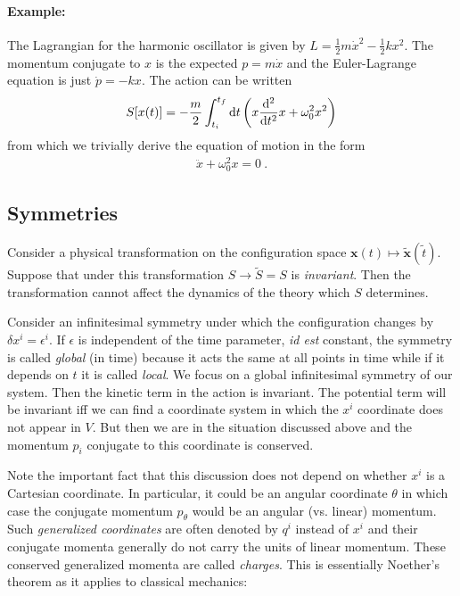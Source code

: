 \documentclass[12pt]{article}
\begin{document}
\paragraph{Example:} The Lagrangian for the harmonic oscillator is given by $L=\frac 12 m \dot x^2-\frac 12 k x^2$. 
The momentum conjugate to $x$ is the expected $p=m\dot x$ and the Euler-Lagrange equation is just $\dot p=-kx$. 
The action can be written
\begin{eqnarray}
S[x(t)]=-{m\over 2} \int_{t_i}^{t_f} \mathrm d t  \left(x{\mathrm d^2\over \mathrm d t^2}x+\omega_0^2 x^2\right) 
\end{eqnarray}
from which we trivially derive the equation of motion in the form
\begin{eqnarray}
\ddot x+\omega_0^2x=0~. 
\end{eqnarray}


\subsection{Symmetries}

Consider a physical transformation on the configuration space $\mathbf x(t)\mapsto \tilde{\mathbf x}(\tilde t)$. Suppose that under this transformation $S\to \tilde S=S$ is {\em invariant}. Then the transformation cannot affect the dynamics of the theory which $S$ determines. 

Consider an infinitesimal symmetry under which the configuration changes by $\delta x^i=\epsilon^i$. If $\epsilon$ is independent of the time parameter, {\it id est} constant, the symmetry is called {\em global} (in time) because it acts the same at all points in time while if it depends on $t$ it is called {\em local}. We focus on a global infinitesimal symmetry of our system. Then the kinetic term in the action is invariant. The potential term will be invariant iff we can find a coordinate system in which the $x^i$ coordinate does not appear in $V$. But then we are in the situation discussed above and the momentum $p_i$ conjugate to this coordinate is conserved. 

Note the important fact that this discussion does not depend on whether $x^i$ is a Cartesian coordinate. In particular, it could be an angular coordinate $\theta$ in which case the conjugate momentum $p_\theta$ would be an angular (vs. linear) momentum. Such {\em generalized coordinates} are often denoted by $q^i$ instead of $x^i$ and their conjugate momenta generally do not carry the units of linear momentum. These conserved generalized momenta are called
{\em charges}. This is essentially Noether's theorem as it applies to classical mechanics: 
\end{document}
